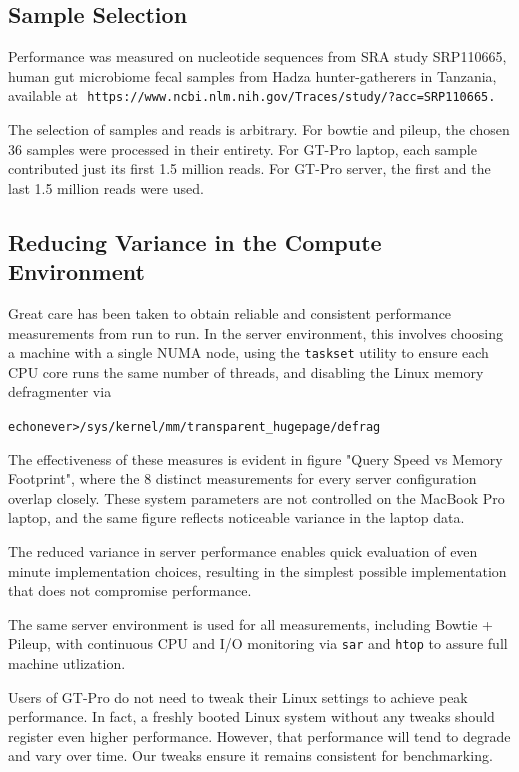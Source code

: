 \documentclass[10pt]{article}
\begin{document}
\subsection{Sample Selection}


Performance was measured on nucleotide sequences from SRA study SRP110665, human gut microbiome fecal samples from Hadza hunter-gatherers in Tanzania, available at \,\,\texttt{https://www.ncbi.nlm.nih.gov/Traces/study/?acc=SRP110665.}

The selection of samples and reads is arbitrary.  For bowtie and pileup, the chosen 36 samples were processed in their entirety.  For GT-Pro laptop, each sample contributed just its first 1.5 million reads.  For GT-Pro server, the first and the last 1.5 million reads were used.

\subsection{Reducing Variance in the Compute Environment}


Great care has been taken to obtain reliable and consistent performance measurements from run to run.   In the server environment, this involves choosing a machine with a single NUMA node,
using the \texttt{taskset} utility to ensure each CPU core runs the same number of threads, and disabling the Linux memory defragmenter via
\begin{alltt}
    echo never > /sys/kernel/mm/transparent_hugepage/defrag
\end{alltt}

The effectiveness of these measures is evident in figure "Query Speed vs Memory Footprint", where the 8 distinct measurements for every server configuration overlap closely.  These system parameters are not controlled on the MacBook Pro laptop, and the same figure reflects noticeable variance in the laptop data.

The reduced variance in server performance enables quick evaluation of even minute implementation choices, resulting in the simplest possible implementation that does not compromise performance.

The same server environment is used for all measurements, including Bowtie + Pileup, with continuous CPU and I/O monitoring via \texttt{sar} and \texttt{htop} to assure full machine utlization.

Users of GT-Pro do not need to tweak their Linux settings to achieve peak performance.  In fact, a freshly booted Linux system without any tweaks should register even higher performance.  However, that performance will tend to degrade and vary over time.  Our tweaks ensure it remains consistent for benchmarking.
\end{document}
